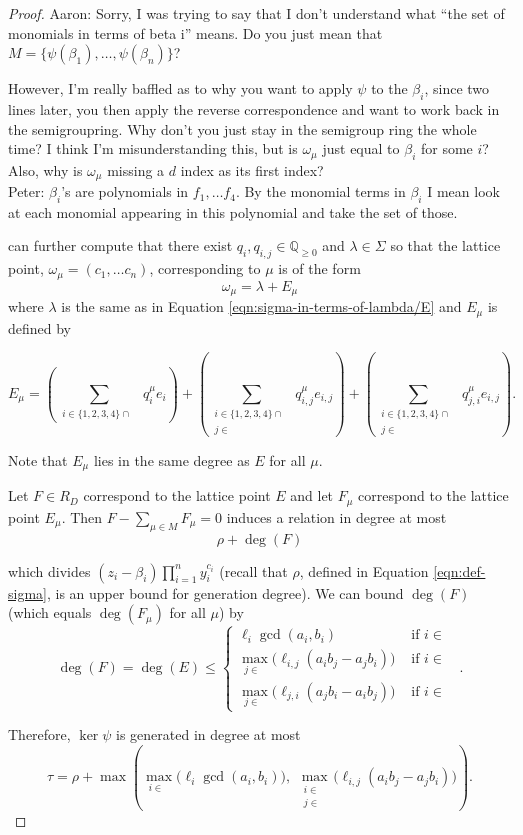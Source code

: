 \documentclass{amsart}
\theoremstyle{plain}
\theoremstyle{definition}
\theoremstyle{remark}
\numberwithin{equation}{section}
\newcommand\bq{{\mathbb Q}}
\newcommand\bida{a}
\newcommand\bidb{b}
\DeclareMathOperator{\Te}{T_=}
\DeclareMathOperator{\Tp}{T_+}
\DeclareMathOperator{\Tm}{T_-}
\begin{document}
\begin{proof}
{Aaron: Sorry, I was trying to say that
I don't understand what ``the set of monomials in terms of beta i'' means.
Do you just mean that $M = \{\psi(\beta_1), \ldots, \psi(\beta_n)\}$?

However, I'm really baffled as to why you want to apply $\psi$ to the
$\beta_i$, since two lines later, you then apply the reverse correspondence
and want to work back in the semigroupring. Why don't you just stay in the
semigroup ring the whole time?
I think I'm misunderstanding this, but is $\omega_\mu$ just equal to
$\beta_i$ for some $i$? Also, why is $\omega_\mu$ missing a $d$ index
as its first index?
\\
Peter: $\beta_i$'s are polynomials in $f_1, \ldots f_4$.  By the monomial terms in $\beta_i$ I mean look at each monomial appearing in this polynomial and take the set of those.
}
can further compute that there exist $q_i, q_{i,j} \in \bq_{\geq 0}$ 
and $\lambda \in
\Sigma$ so that the lattice point, $\omega_\mu = (c_1 ,\ldots c_n)$,
corresponding to $\mu
$ is of the form
\[
	\omega_\mu = \lambda + E_\mu
\]
where $\lambda$ is the same as in Equation \ref{eqn:sigma-in-terms-of-lambda/E} and $E_\mu$ is defined by

\begin{equation}\label{eqn:hirz-E_mu-translation}
E_\mu = \left(\sum_{\substack{i \in \{1, 2, 3, 4\} \cap \Te}}q_i^\mu e_i\right) +
\left(\sum_{\substack{i \in \{1, 2, 3, 4\} \cap \Tp \\ j\in \Tm}} q_{i,j}^\mu
e_{i,j}\right) + \left(\sum_{\substack{i \in \{1, 2, 3, 4\} \cap \Tm \\ j\in
\Tp}} q_{j,i}^\mu e_{i,j}\right).
\end{equation}

Note that $E_\mu$ lies in the same degree as $E$ for all $\mu$.

Let $F\in R_D$ correspond to the lattice point $E$ and let $F_\mu$ correspond to the lattice point $E_\mu$.  
Then $F - \sum_{\mu \in M} F_\mu = 0$ induces a
relation in degree at most
\[
	\rho + \deg(F)
\]

\noindent
which divides $(z_i - \beta_i) \prod_{i = 1}^n y_i^{c_i}$ (recall that $\rho$, defined in Equation \ref{eqn:def-sigma}, is an upper bound for generation degree).
We can bound $\deg(F)$ (which equals $\deg(F_\mu)$ for all $\mu$) by
\[
	\deg(F) = \deg(E) \le \begin{cases}
	\ell_i \gcd(\bida_i, \bidb_i)	&\mbox{ if } i \in \Te \\
	\max_{j \in \Tm} \bigl(\ell_{i, j} (\bida_i \bidb_j - \bida_j \bidb_i)\bigr)
	&\mbox{ if } i \in \Tp \\
	\max_{j \in \Tp} \bigl(\ell_{j, i} (\bida_j \bidb_ i - \bida_i \bidb_j) \bigr)
	&\mbox{ if } i \in \Tm \end{cases}.
\]

\noindent
Therefore, $\ker \psi$ is generated in degree at most
\[
	\tau = \rho
	+ \max \left(\max_{i\in \Te} \bigl(\ell_i \gcd(a_i, b_i) \bigr),
	\; \max_{\substack{i \in \Tp \\ j \in \Tm}} \bigl(\ell_{i, j}
	(\bida_i \bidb_j - \bida_j
	\bidb_i) \bigr) \right).
\]
\end{proof}
\end{document}
